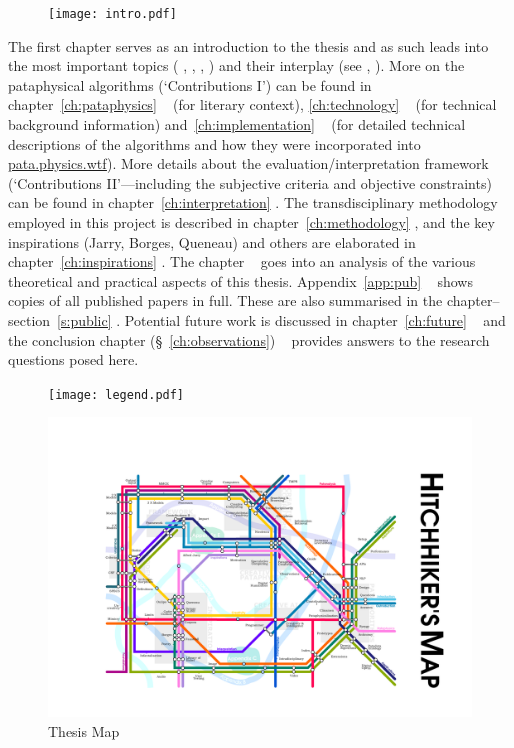\begin{figure}[!htb]
\centering
  \texttt{[image: intro.pdf]}
\end{figure}

The first chapter serves as an introduction to the thesis and as such leads into the most important topics ( \pata,  \creat,  \tech,  \eval) and their interplay (see  \found,  \inter). More on the pataphysical algorithms (`Contributions I') can be found in chapter~\ref{ch:pataphysics} \pata~ (for literary context), \ref{ch:technology} \tech~ (for technical background information) and~\ref{ch:implementation} \imple~ (for detailed technical descriptions of the algorithms and how they were incorporated into \url{pata.physics.wtf}). More details about the evaluation/interpretation framework (`Contributions II'---including the subjective criteria and objective constraints) can be found in chapter~\ref{ch:interpretation} \inter. The transdisciplinary methodology employed in this project is described in chapter~\ref{ch:methodology} \metho, and the key inspirations (Jarry, Borges, Queneau) and others are elaborated in chapter~\ref{ch:inspirations} \inspi. The  chapter \anal~ goes into an analysis of the various theoretical and practical aspects of this thesis. Appendix~\ref{app:pub} \appe~ shows copies of all published papers in full. These are also summarised in the  chapter--section~\ref{s:public} \appli. Potential future work is discussed in chapter~\ref{ch:future} \aspi~ and the conclusion chapter (§~\ref{ch:observations}) \outro~ provides answers to the research questions posed here.

\begin{figure}[!htb]
\centering
  \texttt{[image: legend.pdf]}
\end{figure}

\begin{figure}[!p]
\centering
  \includegraphics[width=\linewidth]{map}
\captionsetup{textformat=empty,labelformat=blank}
\caption[Thesis Map]{Thesis Map}
\label{map}
\end{figure}

\stopcontents[chapters]
